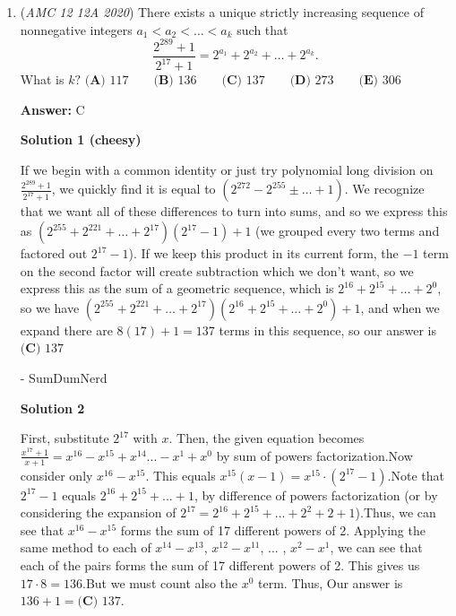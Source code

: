 \begin{enumerate}
	\item (\textit{AMC 12 12A 2020}) There exists a unique strictly increasing sequence of nonnegative integers $a_1 < a_2 < \ldots < a_k$ such that
 \[\frac{2^{289}+1}{2^{17}+1} = 2^{a_1} + 2^{a_2} + \ldots + 2^{a_k}.\]What is $k?$
$\textbf{(A) } 117 \qquad \textbf{(B) } 136 \qquad \textbf{(C) } 137 \qquad \textbf{(D) } 273 \qquad \textbf{(E) } 306$

 \textbf{Answer: }C



\textbf{Solution 1 (cheesy)}

If we begin with a common identity or just try polynomial long division on $\frac{2^{289}+1}{2^{17}+1}$, we quickly find it is equal to $\left( 2^{272}-2^{255} \pm \dots + 1 \right)$. We recognize that we want all of these differences to turn into sums, and so we express this as $\left( 2^{255}+2^{221}+ \dots +2^{17} \right) \left( 2^{17}-1 \right) + 1$ (we grouped every two terms and factored out $2^{17}-1$). If we keep this product in its current form, the $-1$ term on the second factor will create subtraction which we don't want, so we express this as the sum of a geometric sequence, which is $2^{16}+2^{15} + \dots + 2^0$, so we have $\left( 2^{255}+2^{221}+ \dots +2^{17} \right) \left( 2^{16} + 2^{15} + \dots + 2^0 \right) + 1$, and when we expand there are $8(17)+1=137$ terms in this sequence, so our answer is $\boxed{\textbf{(C) } 137}$

 - SumDumNerd

 



\textbf{Solution 2}

First, substitute $2^{17}$ with $x$. Then, the given equation becomes $\frac{x^{17}+1}{x+1}=x^{16}-x^{15}+x^{14}...-x^1+x^0$ by sum of powers factorization.Now consider only $x^{16}-x^{15}$. This equals $x^{15}(x-1)=x^{15} \cdot (2^{17}-1)$.Note that $2^{17}-1$ equals $2^{16}+2^{15}+...+1$, by difference of powers factorization (or by considering the expansion of $2^{17}=2^{16}+2^{15}+...+2^{2}+2 + 1$).Thus, we can see that $x^{16}-x^{15}$ forms the sum of 17 different powers of 2. Applying the same method to each of $x^{14}-x^{13}$, $x^{12}-x^{11}$, ... , $x^{2}-x^{1}$, we can see that each of the pairs forms the sum of 17 different powers of 2. This gives us $17 \cdot 8=136$.But we must count also the $x^0$ term. Thus, Our answer is $136+1=\boxed{\textbf{(C) } 137}$.

 




\end{enumerate}
